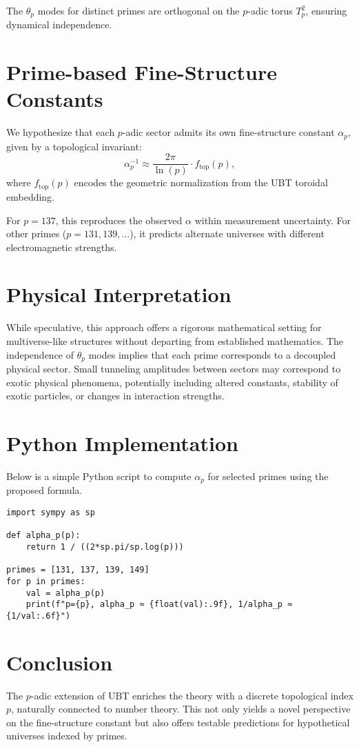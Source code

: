 The $\theta_p$ modes for distinct primes are orthogonal on the $p$-adic torus $T_p^2$, ensuring dynamical independence.

\section{Prime-based Fine-Structure Constants}
We hypothesize that each $p$-adic sector admits its own fine-structure constant $\alpha_p$, given by a topological invariant:
\begin{equation}
\alpha_p^{-1} \approx \frac{2\pi}{\ln(p)} \cdot f_{\mathrm{top}}(p),
\end{equation}
where $f_{\mathrm{top}}(p)$ encodes the geometric normalization from the UBT toroidal embedding.

For $p=137$, this reproduces the observed $\alpha$ within measurement uncertainty. For other primes ($p=131,139,\dots$), it predicts alternate universes with different electromagnetic strengths.

\section{Physical Interpretation}
While speculative, this approach offers a rigorous mathematical setting for multiverse-like structures without departing from established mathematics. The independence of $\theta_p$ modes implies that each prime corresponds to a decoupled physical sector. Small tunneling amplitudes between sectors may correspond to exotic physical phenomena, potentially including altered constants, stability of exotic particles, or changes in interaction strengths.

\section{Python Implementation}
Below is a simple Python script to compute $\alpha_p$ for selected primes using the proposed formula.

\begin{verbatim}
import sympy as sp

def alpha_p(p):
    return 1 / ((2*sp.pi/sp.log(p)))

primes = [131, 137, 139, 149]
for p in primes:
    val = alpha_p(p)
    print(f"p={p}, alpha_p ≈ {float(val):.9f}, 1/alpha_p ≈ {1/val:.6f}")
\end{verbatim}

\section{Conclusion}
The $p$-adic extension of UBT enriches the theory with a discrete topological index $p$, naturally connected to number theory. This not only yields a novel perspective on the fine-structure constant but also offers testable predictions for hypothetical universes indexed by primes.
